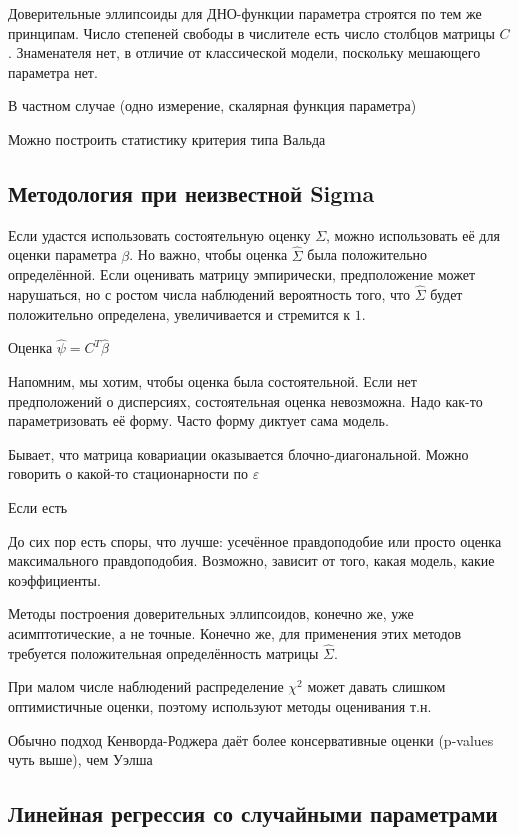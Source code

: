 \documentclass[main.tex]{subfiles}
\begin{document}
Доверительные эллипсоиды для ДНО-функции параметра строятся по тем же принципам.
Число степеней свободы в числителе есть число столбцов матрицы $ C $.
Знаменателя нет, в отличие от классической модели, поскольку мешающего параметра нет.

В частном случае (одно измерение, скалярная функция параметра)

Можно построить статистику критерия типа Вальда %

\subsection{Методология при неизвестной Sigma}

Если удастся использовать состоятельную оценку $ \Sigma $, можно использовать её для оценки параметра $ \beta $.
Но важно, чтобы оценка $ \hat \Sigma $ была положительно определённой.
Если оценивать матрицу эмпирически, предположение может нарушаться, но с ростом числа наблюдений вероятность того, что $ \hat \Sigma $  будет положительно определена, увеличивается и стремится к $ 1 $.

Оценка $ \hat \psi = C^T \hat \beta $ %

Напомним, мы хотим, чтобы оценка была состоятельной.
Если нет предположений о дисперсиях, состоятельная оценка невозможна.
Надо как-то параметризовать её форму.
Часто форму диктует сама модель. 

Бывает, что матрица ковариации оказывается блочно-диагональной.
Можно говорить о какой-то стационарности по $ \varepsilon $ %

Если есть 


До сих пор есть споры, что лучше: усечённое правдоподобие или просто оценка максимального правдоподобия.
Возможно, зависит от того, какая модель, какие коэффициенты.

Методы построения доверительных эллипсоидов, конечно же, уже асимптотические, а не точные.
Конечно же, для применения этих методов требуется положительная определённость матрицы  $ \hat \Sigma $.

При малом числе наблюдений распределение $ \chi^2 $ может давать слишком оптимистичные оценки, поэтому используют методы оценивания т.н.

Обычно подход Кенворда-Роджера даёт более консервативные оценки (p-values чуть выше), чем Уэлша %

\subsection{ Линейная регрессия со случайными параметрами }
\end{document}
